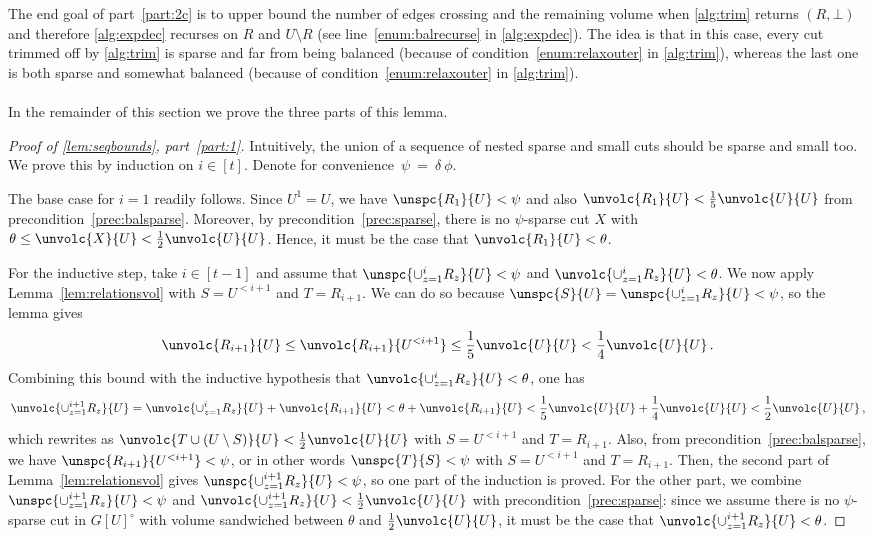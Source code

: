   The end goal of part~\eqref{part:2c} is to upper bound the number of edges crossing and the remaining volume when \cref{alg:trim} returns $(R,\bot)$ and therefore \cref{alg:expdec} recurses on $R$ and $U \setminus R$ (see line~\eqref{enum:balrecurse} in \cref{alg:expdec}). The idea is that in this case, every cut trimmed off by \cref{alg:trim} is sparse and far from being balanced (because of condition~\eqref{enum:relaxouter} in \cref{alg:trim}), whereas the last one is both sparse and somewhat balanced (because of condition~\eqref{enum:relaxouter} in \cref{alg:trim}).
 \\~\\
 In the remainder of this section we prove the three parts of this lemma.
 \begin{proof}[Proof of \cref{lem:seqbounds}, part~\eqref{part:1}]
 	Intuitively, the union of a sequence of nested sparse and small cuts should be sparse and small too. We prove this by induction on $i \in [t]$. Denote for convenience~$\psi~=~\delta~\phi$.
 	
 	The base case for $i=1$ readily follows. Since $U^1 =U$, we have $\unspc{R_1}{U} < \psi$ and also $\unvolc{R_1}{U} < \frac{1}{5}\unvolc{U}{U}$ from precondition~\eqref{prec:balsparse}. Moreover,  by precondition~\eqref{prec:sparse}, there is no $\psi$-sparse cut $X$ with $\theta \le \unvolc{X}{U} < \frac{1}{2}\unvolc{U}{U}$. Hence, it must be the case that $\unvolc{R_1}{U} < \theta$.
 	
 	For the inductive step, take $i \in [t-1]$ and assume that $\unspc{\cup_{z=1}^i R_z}{U} < \psi$ and $\unvolc{\cup_{z=1}^i R_z}{U} < \theta$. We now apply Lemma~\ref{lem:relationsvol} with $S = U^{<i+1}$ and $T = R_{i+1}$. We can do so because $\unspc{S}{U} = \unspc{\cup_{z=1}^i R_z}{U} < \psi$, so the lemma gives
 	\begin{align*}
 		\unvolc{R_{i+1}}{U} \le \unvolc{R_{i+1}}{U^{<i+1}} \le \frac{1}{5}\unvolc{U}{U}  < \frac{1}{4}\unvolc{U}{U}\, .
 	\end{align*}
 	Combining this bound with the inductive hypothesis that $\unvolc{\cup_{z=1}^i R_z}{U} < \theta$, one has
 	\begin{equation*}
 		\unvolc{\cup_{z=1}^{i+1} R_z}{U} = \unvolc{\cup_{z=1}^i R_z}{U}+\unvolc{R_{i+1}}{U} < \theta+\unvolc{R_{i+1}}{U} < \frac{1}{5}\unvolc{U}{U}+ \frac{1}{4}\unvolc{U}{U}  < \frac{1}{2}\unvolc{U}{U} \, ,
 	\end{equation*}
 which rewrites as $\unvolc{T \cup (U \setminus S)}{U} < \frac{1}{2} \unvolc{U}{U}$ with  $S = U^{<i+1}$ and $T = R_{i+1}$. Also, from precondition~\eqref{prec:balsparse}, we have $\unspc{R_{i+1}}{U^{<i+1}} < \psi$, or in other words $\unspc{T}{S} < \psi$ with $S = U^{<i+1}$ and $T = R_{i+1}$. Then, the second part of Lemma~\ref{lem:relationsvol} gives $\unspc{\cup_{z=1}^{i+1} R_z}{U} < \psi$, so one part of the induction is proved. For the other part, we combine $\unspc{\cup_{z=1}^{i+1} R_z}{U} < \psi$ and $\unvolc{\cup_{z=1}^{i+1} R_z}{U} < \frac{1}{2}\unvolc{U}{U}$ with precondition~\eqref{prec:sparse}: since we assume there is no $\psi$-sparse cut in $G[U]^\circ$ with volume sandwiched between $\theta$ and $\frac{1}{2}\unvolc{U}{U}$, it must be the case that $\unvolc{\cup_{z=1}^{i+1} R_z}{U} < \theta$.
\end{proof}

